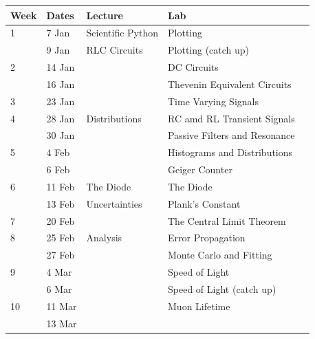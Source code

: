 \documentclass[12pt]{article}
\begin{document}
\begin{table}[h!]
\normalsize %
\begin{tabular}{ lllll }
\hline
\textbf{Week} & \textbf{Dates} & \textbf{Lecture} & \textbf{Lab} \\
\hline
1 & 7 Jan & Scientific Python & Plotting \\
   & 9 Jan & RLC Circuits & Plotting (catch up)\\
\hline
2 & 14 Jan & & DC Circuits \\
  & 16 Jan & & Thevenin Equivalent Circuits \\
\hline
3 & 23 Jan & & Time Varying Signals \\
\hline
4 & 28 Jan & Distributions & RC amd RL Transient Signals \\
   & 30 Jan & &  Passive Filters and Resonance \\
\hline
5 & 4 Feb & & Histograms and Distributions\\
   & 6 Feb & & Geiger Counter\\
\hline
6 & 11 Feb & The Diode & The Diode \\
   & 13 Feb & Uncertainties & Plank's Constant \\
\hline
7 & 20 Feb & & The Central Limit Theorem \\
\hline
8 & 25 Feb & Analysis & Error Propagation \\
   & 27 Feb & & Monte Carlo and Fitting \\
\hline
9 & 4 Mar & & Speed of Light \\
   & 6 Mar & & Speed of Light  (catch up) \\
\hline
10 & 11 Mar & & Muon Lifetime\\
   & 13 Mar & & \\
\hline
\end{tabular} 
\end{table}
\end{document}
